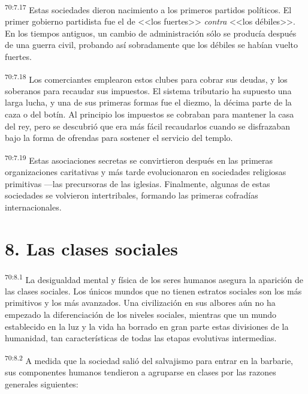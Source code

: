 \par
\textsuperscript{70:7.17} Estas sociedades dieron nacimiento a los primeros partidos políticos. El primer gobierno partidista fue el de <<los fuertes>> \textit{contra} <<los débiles>>. En los tiempos antiguos, un cambio de administración sólo se producía después de una guerra civil, probando así sobradamente que los débiles se habían vuelto fuertes.

\par
\textsuperscript{70:7.18} Los comerciantes emplearon estos clubes para cobrar sus deudas, y los soberanos para recaudar sus impuestos. El sistema tributario ha supuesto una larga lucha, y una de sus primeras formas fue el diezmo, la décima parte de la caza o del botín. Al principio los impuestos se cobraban para mantener la casa del rey, pero se descubrió que era más fácil recaudarlos cuando se disfrazaban bajo la forma de ofrendas para sostener el servicio del templo.

\par
\textsuperscript{70:7.19} Estas asociaciones secretas se convirtieron después en las primeras organizaciones caritativas y más tarde evolucionaron en sociedades religiosas primitivas ---las precursoras de las iglesias. Finalmente, algunas de estas sociedades se volvieron intertribales, formando las primeras cofradías internacionales.

\section*{8. Las clases sociales}
\par
\textsuperscript{70:8.1} La desigualdad mental y física de los seres humanos asegura la aparición de las clases sociales. Los únicos mundos que no tienen estratos sociales son los más primitivos y los más avanzados. Una civilización en sus albores aún no ha empezado la diferenciación de los niveles sociales, mientras que un mundo establecido en la luz y la vida ha borrado en gran parte estas divisiones de la humanidad, tan características de todas las etapas evolutivas intermedias.

\par
\textsuperscript{70:8.2} A medida que la sociedad salió del salvajismo para entrar en la barbarie, sus componentes humanos tendieron a agruparse en clases por las razones generales siguientes:

